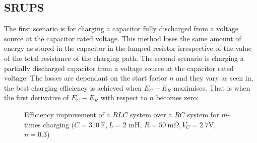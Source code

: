 \subsection {SRUPS}    

 The first scenario is for charging a capacitor fully discharged from a voltage source at the capacitor rated voltage. This method loses the same amount of energy as stored in the capacitor in the lumped resistor irrespective of the value of the total resistance of the charging path. The second scenario is charging a partially discharged capacitor from a voltage source at the capacitor rated voltage. The losses are dependant on the start factor $n$ and they vary as seen in, the best charging efficiency is achieved when $E_C - E_R$ maximises. That is when the first derivative of $E_C - E_R$ with respect to $n$ becomes zero:


\begin{figure}[h]
	\centering
	\caption[Efficiency improvement of a $RLC$ system]
	{%
		\label{fg:RC_RLC_advantage_sim}
		\centering
		Efficiency improvement of a $RLC$ system over a $RC$ system for $m$-times charging ($C = 310~$F$, L = 2$ mH, $R = 50~$m$\Omega, V_C = 2.7 $V, $n = 0.3$)}
\end{figure}





